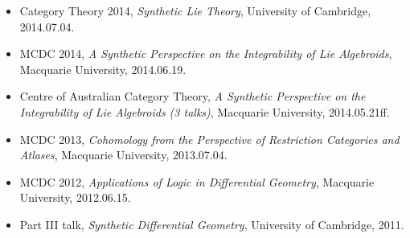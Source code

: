 \documentclass[10pt]{article}
\begin{document}
\begin{itemize}
    \item Category Theory 2014, \emph{Synthetic Lie Theory}, University of Cambridge, 2014.07.04.
    \item MCDC 2014, \emph{A Synthetic Perspective on the Integrability of Lie Algebroids}, Macquarie University, 2014.06.19.
    \item Centre of Australian Category Theory, \emph{A Synthetic Perspective on the Integrability of Lie Algebroids (3 talks)}, Macquarie University, 2014.05.21ff.
    \item MCDC 2013, \emph{Cohomology from the Perspective of Restriction Categories and Atlases}, Macquarie University, 2013.07.04.
    \item MCDC 2012, \emph{Applications of Logic in Differential Geometry}, Macquarie University, 2012.06.15.
    \item Part III talk, \emph{Synthetic Differential Geometry}, University of Cambridge, 2011.
\end{itemize}
\end{document}
